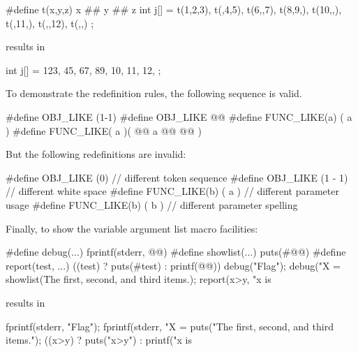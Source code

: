 \begin{codeblock}
#define t(x,y,z) x ## y ## z
int j[] = { t(1,2,3), t(,4,5), t(6,,7), t(8,9,),
  t(10,,), t(,11,), t(,,12), t(,,) };
\end{codeblock}

results in

\begin{codeblock}
int j[] = { 123, 45, 67, 89,
  10, 11, 12, };
\end{codeblock}
\exitexample

\pnum
\enterexample
To demonstrate the redefinition rules,
the following sequence is valid.

\begin{codeblock}
#define OBJ_LIKE      (1-1)
#define OBJ_LIKE      @@
#define FUNC_LIKE(a)   ( a )
#define FUNC_LIKE( a )(     @@
                a @@
                  @\tcode{*/}@ )
\end{codeblock}

But the following redefinitions are invalid:

\begin{codeblock}
#define OBJ_LIKE    (0)      // different token sequence
#define OBJ_LIKE    (1 - 1)  // different white space
#define FUNC_LIKE(b) ( a )   // different parameter usage
#define FUNC_LIKE(b) ( b )   // different parameter spelling
\end{codeblock}
\exitexample

\pnum
\enterexample
Finally, to show the variable argument list macro facilities:

\begin{codeblock}
#define debug(...) fprintf(stderr, @@)
#define showlist(...) puts(#@@)
#define report(test, ...) ((test) ? puts(#test) : printf(@@))
debug("Flag");
debug("X = %
showlist(The first, second, and third items.);
report(x>y, "x is %
\end{codeblock}

results in

\begin{codeblock}
fprintf(stderr, "Flag");
fprintf(stderr, "X = %
puts("The first, second, and third items.");
((x>y) ? puts("x>y") : printf("x is %
  
\end{codeblock}
\exitexample
{}

